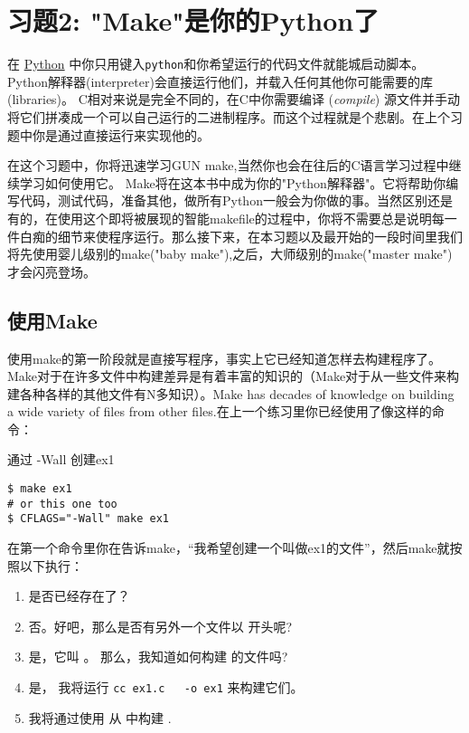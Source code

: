 \chapter{习题2: "Make"是你的Python了}

在 \href{http://learnpythonthehardway.org}{Python} 中你只用键入\verb|python|和你希望运行的代码文件就能城启动脚本。Python解释器(interpreter)会直接运行他们，并载入任何其他你可能需要的库(libraries)。 C相对来说是完全不同的，在C中你需要编译 (\emph{compile}) 源文件并手动将它们拼凑成一个可以自己运行的二进制程序。而这个过程就是个悲剧。在上个习题中你是通过直接运行来实现他的。

在这个习题中，你将迅速学习GUN make,当然你也会在往后的C语言学习过程中继续学习如何使用它。 Make将在这本书中成为你的"Python解释器"。它将帮助你编写代码，测试代码，准备其他，做所有Python一般会为你做的事。当然区别还是有的，在使用这个即将被展现的智能makefile的过程中，你将不需要总是说明每一件白痴的细节来使程序运行。那么接下来，在本习题以及最开始的一段时间里我们将先使用婴儿级别的make("baby make"),之后，大师级别的make("master make")才会闪亮登场。


\section{使用Make}

使用make的第一阶段就是直接写程序，事实上它已经知道怎样去构建程序了。Make对于在许多文件中构建差异是有着丰富的知识的（Make对于从一些文件来构建各种各样的其他文件有N多知识）。Make has decades of knowledge on building
a wide variety of files from other files.在上一个练习里你已经使用了像这样的命令：

\begin{Terminal}{通过 -Wall 创建ex1}
\begin{lstlisting}
$ make ex1
# or this one too
$ CFLAGS="-Wall" make ex1
\end{lstlisting}
\end{Terminal}

在第一个命令里你在告诉make，“我希望创建一个叫做ex1的文件”，然后make就按照以下执行：

\begin{enumerate}
\item {} 是否已经存在了？
\item 否。好吧，那么是否有另外一个文件以  开头呢?
\item 是，它叫 。 那么，我知道如何构建  的文件吗?
\item 是， 我将运行 \verb|cc ex1.c   -o ex1| 来构建它们。
\item 我将通过使用  从  中构建 .
\end{enumerate}


